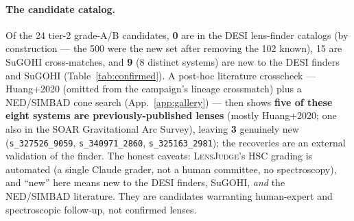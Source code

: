 \documentclass[11pt,letterpaper]{article}
\newcommand{\lj}{\textsc{LensJudge}}
\begin{document}
\paragraph{The candidate catalog.} Of the 24 tier-2 grade-A/B candidates, \textbf{0} are in the DESI
lens-finder catalogs (by construction --- the 500 were the new set after removing the 102 known), 15 are
SuGOHI cross-matches, and \textbf{9} (8 distinct systems) are new to the DESI finders and SuGOHI
(Table~\ref{tab:confirmed}). A post-hoc literature crosscheck --- Huang+2020 (omitted from the
campaign's lineage crossmatch) plus a NED/SIMBAD cone search (App.~\ref{app:gallery}) --- then shows
\textbf{five of these eight systems are previously-published lenses} (mostly Huang+2020; one also in the
SOAR Gravitational Arc Survey), leaving \textbf{3} genuinely new (\texttt{s\_327526\_9059},
\texttt{s\_340971\_2860}, \texttt{s\_325163\_2981}); the recoveries are an external validation of the
finder. The honest caveats: \lj{}'s HSC grading is automated (a single Claude grader, not a human
committee, no spectroscopy), and ``new'' here means new to the DESI finders, SuGOHI, \emph{and} the
NED/SIMBAD literature. They are candidates warranting human-expert and spectroscopic follow-up, not
confirmed lenses.
\end{document}

